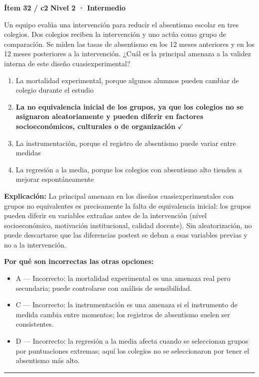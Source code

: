 \documentclass[12pt,a4paper]{article}
\begin{document}
\begin{mdframed}[backgroundcolor=fondogris,linecolor=ambar,linewidth=1pt,innerleftmargin=10pt,innerrightmargin=10pt,innertopmargin=7pt,innerbottommargin=7pt]
\textbf{Ítem 32 / c2} \hfill {\small\bfseries\color{ambar} Nivel 2 · Intermedio}
\end{mdframed}

Un equipo evalúa una intervención para reducir el absentismo escolar en tres colegios. Dos colegios reciben la intervención y uno actúa como grupo de comparación. Se miden las tasas de absentismo en los 12 meses anteriores y en los 12 meses posteriores a la intervención. ¿Cuál es la principal amenaza a la validez interna de este diseño cuasiexperimental?

\begin{enumerate}
  \item[A.] La mortalidad experimental, porque algunos alumnos pueden cambiar de colegio durante el estudio
  \item[\textbf{\color{verde}B.}] \textbf{\color{verde} La no equivalencia inicial de los grupos, ya que los colegios no se asignaron aleatoriamente y pueden diferir en factores socioeconómicos, culturales o de organización} \hfill $\checkmark$
  \item[C.] La instrumentación, porque el registro de absentismo puede variar entre medidas
  \item[D.] La regresión a la media, porque los colegios con absentismo alto tienden a mejorar espontáneamente
\end{enumerate}

\noindent\textbf{\color{azul}Explicación:} La principal amenaza en los diseños cuasiexperimentales con grupos no equivalentes es precisamente la falta de equivalencia inicial: los grupos pueden diferir en variables extrañas antes de la intervención (nivel socioeconómico, motivación institucional, calidad docente). Sin aleatorización, no puede descartarse que las diferencias postest se deban a esas variables previas y no a la intervención.

\noindent\textbf{\color{gris}Por qué son incorrectas las otras opciones:}
\begin{itemize}
  \item {\small A — Incorrecto: la mortalidad experimental es una amenaza real pero secundaria; puede controlarse con análisis de sensibilidad.}
  \item {\small C — Incorrecto: la instrumentación es una amenaza si el instrumento de medida cambia entre momentos; los registros de absentismo suelen ser consistentes.}
  \item {\small D — Incorrecto: la regresión a la media afecta cuando se seleccionan grupos por puntuaciones extremas; aquí los colegios no se seleccionaron por tener el absentismo más alto.}
\end{itemize}
\vspace{8pt}\hrule\vspace{10pt}
\end{document}
